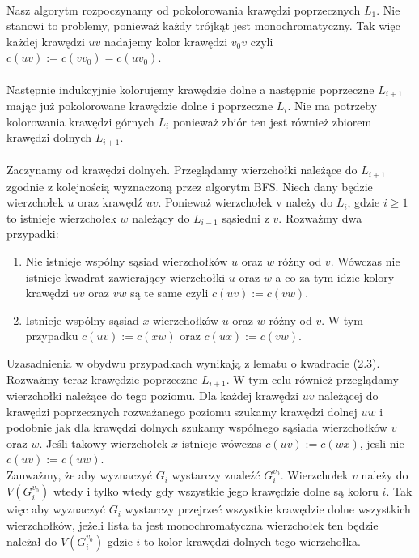 \documentclass[12pt,a4paper,titlepage]{article}
\begin{document}
\\
Nasz algorytm rozpoczynamy od pokolorowania krawędzi poprzecznych $L_1$. Nie stanowi to problemy, ponieważ każdy trójkąt jest monochromatyczny. Tak więc każdej krawędzi $uv$ nadajemy kolor krawędzi $v_0 v$ czyli $c(uv):=c(v v_0 )=c(u v_0 )$.\\
\\
Następnie indukcyjnie kolorujemy krawędzie dolne a następnie poprzeczne $L_{i+1}$ mając już pokolorowane krawędzie dolne i poprzeczne $L_i$. Nie ma potrzeby kolorowania krawędzi górnych $L_i$ ponieważ zbiór ten jest również zbiorem krawędzi dolnych $L_{i+1}$.\\
\\
Zaczynamy od krawędzi dolnych. Przeglądamy wierzchołki należące do $L_{i+1}$ zgodnie z kolejnością wyznaczoną przez algorytm BFS. Niech dany będzie wierzchołek $u$ oraz krawędź $uv$. Ponieważ wierzchołek v należy do $L_i$, gdzie $i\geqslant 1$ to istnieje wierzchołek $w$ należący do $L_{i-1}$ sąsiedni z $v$. Rozważmy dwa przypadki:
\begin{enumerate}
\item Nie istnieje wspólny sąsiad wierzchołków $u$ oraz $w$ różny od $v$. Wówczas nie istnieje kwadrat zawierający wierzchołki $u$ oraz $w$ a co za tym idzie kolory krawędzi $uv$ oraz $vw$ są te same czyli $c(uv):=c(vw)$.
\item Istnieje wspólny sąsiad $x$ wierzchołków $u$ oraz $w$ różny od $v$. W tym przypadku $c(uv):=c(xw)$ oraz $c(ux):=c(vw)$. 
\end{enumerate}
Uzasadnienia w obydwu przypadkach wynikają z lematu o kwadracie (2.3).\\
Rozważmy teraz krawędzie poprzeczne $L_{i+1}$. W tym celu również przeglądamy wierzchołki należące do tego poziomu. Dla każdej krawędzi $uv$ należącej do krawędzi poprzecznych rozważanego poziomu szukamy krawędzi dolnej $uw$ i podobnie jak dla krawędzi dolnych szukamy wspólnego sąsiada wierzchołków $v$ oraz $w$. Jeśli takowy wierzchołek $x$ istnieje wówczas $c(uv):=c(wx)$, jesli nie $c(uv):=c(uw)$.\\
Zauważmy, że aby wyznaczyć $G_i$ wystarczy znaleźć $G_i ^{v_0}$. Wierzchołek $v$ należy do $V(G_i ^{v_0})$ wtedy i tylko wtedy gdy wszystkie jego krawędzie dolne są koloru $i$. Tak więc aby wyznaczyć $G_i$ wystarczy przejrzeć wszystkie krawędzie dolne wszystkich wierzchołków, jeżeli lista ta jest monochromatyczna wierzchołek ten będzie należał do $V(G_i ^{v_0})$ gdzie $i$ to kolor krawędzi dolnych tego wierzchołka.\\
\end{document}
